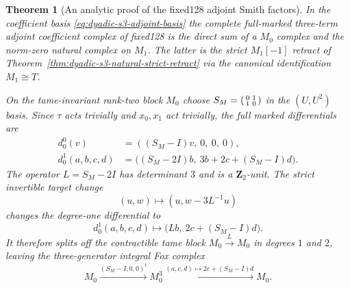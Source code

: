 \documentclass[11pt]{article}
\newtheorem{theorem}{Theorem}[section]
\theoremstyle{definition}
\begin{document}
\begin{theorem}[An analytic proof of the fixed128 adjoint Smith factors]
\label{thm:dyadic-s3-adjoint-analytic-smith}
In the coefficient basis
\eqref{eq:dyadic-s3-adjoint-basis}
the complete full-marked
three-term adjoint \emph{coefficient}
complex of fixed128 is the direct
sum of a $M_0$ complex and the
norm-zero natural complex on $M_1$.
The latter is the strict
$M_1[-1]$ retract of
Theorem~\ref{thm:dyadic-s3-natural-strict-retract}
via the canonical identification
$M_1\cong T$.

On the tame-invariant rank-two block
$M_0$ choose $S_M=\begin{psmallmatrix}
0&1\\1&0\end{psmallmatrix}$ in
the $(U,U^2)$ basis.
Since $\tau$ acts trivially
and $x_0,x_1$ act trivially,
the full marked differentials are
\begin{equation}\label{eq:dyadic-s3-tame-invariant-differentials}
\boxed{
\begin{aligned}
d_0^0(v)
&=((S_M-I)v,\ 0,\ 0,\ 0),\\
d_0^1(a,b,c,d)
&=\bigl((S_M-2I)b,\
  3b+2c+(S_M-I)d\bigr).
\end{aligned}}
\end{equation}
The operator $L=S_M-2I$ has
determinant $3$ and is a
$\mathbf Z_2$-unit.
The strict invertible target
change
\begin{equation}\label{eq:dyadic-s3-tame-invariant-row-change}
(u,w)\longmapsto
(u,w-3L^{-1}u)
\end{equation}
changes the degree-one
differential to
\begin{equation}\label{eq:dyadic-s3-tame-invariant-split-d1}
d_0^1(a,b,c,d)
\longmapsto
\bigl(Lb,\ 2c+(S_M-I)d\bigr).
\end{equation}
It therefore splits off the
contractible tame block
$M_0\xrightarrow{L}M_0$
in degrees $1$ and $2$,
leaving the three-generator
integral Fox complex
\begin{equation}\label{eq:dyadic-s3-tame-invariant-fox-core}
\boxed{\quad
M_0\xrightarrow{(S_M-I,0,0)^t}M_0^3
\xrightarrow{(a,c,d)\mapsto
2c+(S_M-I)d}M_0.
\quad}
\end{equation}


\end{theorem}
\end{document}
